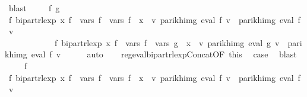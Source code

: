 \begin{isabellebody}
\ blast\isanewline
{}\isamarkupfalse%
\isanewline
\ \ \isamarkupfalse%
\ {\isacharparenleft}{\kern0pt}{}\ f\ g{\isacharparenright}{\kern0pt}\isanewline
\ \ \isamarkupfalse%
\ \isamarkupfalse%
\ {\isachardoublequoteopen}{\isasymexists}f{\isacharprime}{\kern0pt}{\isachardot}{\kern0pt}\ bipart{\isacharunderscore}{\kern0pt}rlexp\ x\ f{\isacharprime}{\kern0pt}\ {\isasymand}\ vars\ f{\isacharprime}{\kern0pt}\ {\isacharequal}{\kern0pt}\ vars\ f\ {\isasymunion}\ {\isacharbraceleft}{\kern0pt}x{\isacharbraceright}{\kern0pt}\ {\isasymand}\ {\isacharparenleft}{\kern0pt}{\isasymforall}v{\isachardot}{\kern0pt}\ parikh{\isacharunderscore}{\kern0pt}img\ {\isacharparenleft}{\kern0pt}eval\ f\ v{\isacharparenright}{\kern0pt}\ {\isacharequal}{\kern0pt}\ parikh{\isacharunderscore}{\kern0pt}img\ {\isacharparenleft}{\kern0pt}eval\ f{\isacharprime}{\kern0pt}\ v{\isacharparenright}{\kern0pt}{\isacharparenright}{\kern0pt}{\isachardoublequoteclose}\isanewline
\ \ \ \ \ \ \ \ \ \ \ \ {\isachardoublequoteopen}{\isasymexists}f{\isacharprime}{\kern0pt}{\isachardot}{\kern0pt}\ bipart{\isacharunderscore}{\kern0pt}rlexp\ x\ f{\isacharprime}{\kern0pt}\ {\isasymand}\ vars\ f{\isacharprime}{\kern0pt}\ {\isacharequal}{\kern0pt}\ vars\ g\ {\isasymunion}\ {\isacharbraceleft}{\kern0pt}x{\isacharbraceright}{\kern0pt}\ {\isasymand}\ {\isacharparenleft}{\kern0pt}{\isasymforall}v{\isachardot}{\kern0pt}\ parikh{\isacharunderscore}{\kern0pt}img\ {\isacharparenleft}{\kern0pt}eval\ g\ v{\isacharparenright}{\kern0pt}\ {\isacharequal}{\kern0pt}\ parikh{\isacharunderscore}{\kern0pt}img\ {\isacharparenleft}{\kern0pt}eval\ f{\isacharprime}{\kern0pt}\ v{\isacharparenright}{\kern0pt}{\isacharparenright}{\kern0pt}{\isachardoublequoteclose}\isanewline
\ \ \ \ \isamarkupfalse%
\ auto\isanewline
\ \ \isamarkupfalse%
\ reg{\isacharunderscore}{\kern0pt}eval{\isacharunderscore}{\kern0pt}bipart{\isacharunderscore}{\kern0pt}rlexp{\isacharunderscore}{\kern0pt}Concat{\isacharbrackleft}{\kern0pt}OF\ this{\isacharbrackright}{\kern0pt}\ \isamarkupfalse%
\ {\isacharquery}{\kern0pt}case\ \isamarkupfalse%
\ blast\isanewline
{}\isamarkupfalse%
\isanewline
\ \ \isamarkupfalse%
\ {\isacharparenleft}{\kern0pt}{}\ f{\isacharparenright}{\kern0pt}\isanewline
\ \ \isamarkupfalse%
\ \isamarkupfalse%
\ {\isachardoublequoteopen}{\isasymexists}f{\isacharprime}{\kern0pt}{\isachardot}{\kern0pt}\ bipart{\isacharunderscore}{\kern0pt}rlexp\ x\ f{\isacharprime}{\kern0pt}\ {\isasymand}\ vars\ f{\isacharprime}{\kern0pt}\ {\isacharequal}{\kern0pt}\ vars\ f\ {\isasymunion}\ {\isacharbraceleft}{\kern0pt}x{\isacharbraceright}{\kern0pt}\ {\isasymand}\ {\isacharparenleft}{\kern0pt}{\isasymforall}v{\isachardot}{\kern0pt}\ parikh{\isacharunderscore}{\kern0pt}img\ {\isacharparenleft}{\kern0pt}eval\ f\ v{\isacharparenright}{\kern0pt}\ {\isacharequal}{\kern0pt}\ parikh{\isacharunderscore}{\kern0pt}img\ {\isacharparenleft}{\kern0pt}eval\ f{\isacharprime}{\kern0pt}\ v{\isacharparenright}{\kern0pt}{\isacharparenright}{\kern0pt}{\isachardoublequoteclose}\isanewline

\end{isabellebody}
